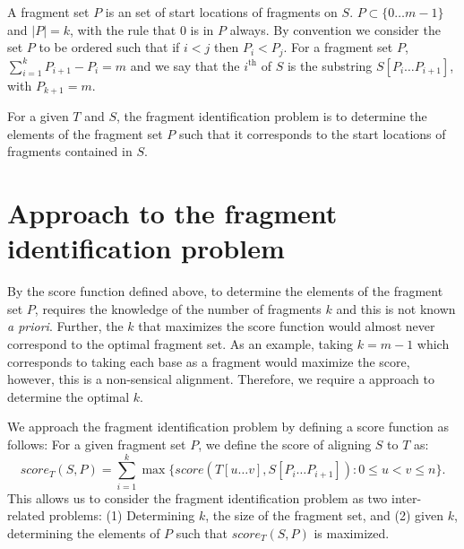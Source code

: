 A fragment set $P$ is an set of start locations of fragments on $S$. $P
\subset \{0 \dots m-1\}$ and $|P| = k$, with the rule that $0$ is in $P$
always.
By convention we consider the set $P$ to be ordered such that if $i < j$
then $P_i < P_j$.
For a fragment set $P$, $\sum_{i = 1}^{k} P_{i+1} - P_i = m$ and we say
that the $i^{\text{th}}$ of $S$ is the substring $S[P_i \dots P_{i+1}]$,
with $P_{k+1} = m$.

For a given $T$ and $S$, the fragment identification problem is to
determine the elements of the fragment set $P$ such that it corresponds
to the start locations of fragments contained in $S$.



\section{Approach to the fragment identification problem}
By the score function defined above, to determine the elements of the
fragment set $P$, requires the knowledge of the number of fragments $k$
and this is not known \textit{a priori}. Further, the $k$ that maximizes
the score function would almost never correspond to the optimal fragment
set. As an example, taking $k=m-1$ which corresponds to taking each base
as a fragment would maximize the score, however, this is a non-sensical
alignment.
Therefore, we require a approach to determine the optimal $k$.


We approach the fragment identification problem by defining a score
function as follows:
For a given fragment set $P$, we define the score of aligning $S$ to $T$
as: \[score_T(S,P) = \sum_{i=1}^{k} \max\{score(T[u \dots v], S[P_i
\dots P_{i+1}]): 0 \leq u < v \leq n\}.\] This allows us to
consider the fragment identification problem as two inter-related
problems: (1) Determining $k$, the size of the fragment set, and (2)
given $k$, determining the elements of $P$ such that $score_T(S, P)$ is
maximized.



